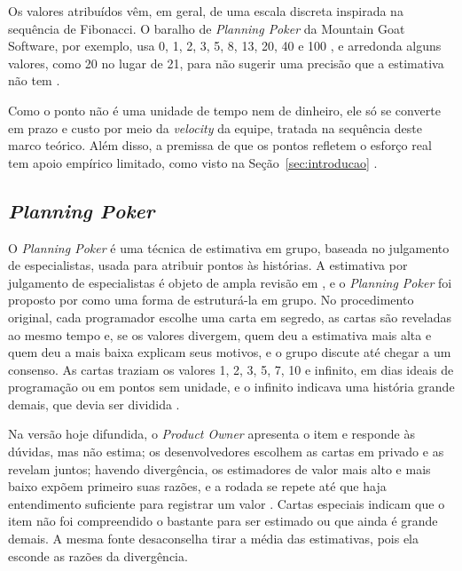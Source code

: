 Os valores atribuídos vêm, em geral, de uma escala discreta inspirada na
sequência de Fibonacci. O baralho de \textit{Planning Poker} da Mountain Goat
Software, por exemplo, usa 0, 1, 2, 3, 5, 8, 13, 20, 40 e 100
\cite{mountaingoatpoker}, e arredonda alguns valores, como 20 no lugar de 21,
para não sugerir uma precisão que a estimativa não tem \cite{mountaingoatfib}.

Como o ponto não é uma unidade de tempo nem de dinheiro, ele só se converte em
prazo e custo por meio da \textit{velocity} da equipe, tratada na sequência
deste marco teórico. Além disso, a premissa de que os pontos refletem o esforço
real tem apoio empírico limitado, como visto na Seção~\ref{sec:introducao}
\cite{tawosi2022}.

\subsection{\textit{Planning Poker}}
\label{sub:planningpoker}

O \textit{Planning Poker} é uma técnica de estimativa em grupo, baseada no
julgamento de especialistas, usada para atribuir pontos às histórias. A
estimativa por julgamento de especialistas é objeto de ampla revisão em
, e o \textit{Planning Poker} foi proposto por
 como uma forma de estruturá-la em grupo. No
procedimento original, cada programador escolhe uma carta em segredo, as cartas
são reveladas ao mesmo tempo e, se os valores divergem, quem deu a estimativa
mais alta e quem deu a mais baixa explicam seus motivos, e o grupo discute até
chegar a um consenso. As cartas traziam os valores 1, 2, 3, 5, 7, 10 e infinito,
em dias ideais de programação ou em pontos sem unidade, e o infinito indicava
uma história grande demais, que devia ser dividida \cite{grenning2002}.

Na versão hoje difundida, o \textit{Product Owner} apresenta o item e responde
às dúvidas, mas não estima; os desenvolvedores escolhem as cartas em privado e
as revelam juntos; havendo divergência, os estimadores de valor mais alto e mais
baixo expõem primeiro suas razões, e a rodada se repete até que haja
entendimento suficiente para registrar um valor \cite{mountaingoatpoker}. Cartas
especiais indicam que o item não foi compreendido o bastante para ser estimado
ou que ainda é grande demais. A mesma fonte desaconselha tirar a média das
estimativas, pois ela esconde as razões da divergência.

